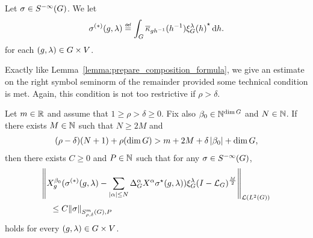 \begin{definition}
    Let $\sigma \in {S^{-\infty} (G)}$.
    We let
    \begin{align*}
        \sigma^{(*)}(g, \lambda)
        \defeq \int_\Group \conj \kappa_{g h^{-1}}(h^{-1}) \adj{\Rep \lambda(h)} \dd h.
    \end{align*}
    for each $(g, \lambda) \in G \times V$.
\end{definition}

Exactly like Lemma~\ref{lemma:prepare_composition_formula},
we give an estimate on the right symbol seminorm of the remainder provided some technical condition is met.
Again,
this condition is not too restrictive if $\rho > \delta$.

\begin{lemma}
\label{lemma:prepare_adjoint_formula}
    Let $m \in \mathbb{R}$ and
    assume that $1 \geq \rho > \delta \geq 0$.
    Fix also $\beta_0 \in \mathbb{N}^{\dim G}$ and $N \in \mathbb{N}$.
    If there exists $M \in \mathbb{N}$ such that $N \geq 2M$ and
    \begin{align*}
        (\rho - \delta) (N + 1) + \rho (\dim G)
        > m + 2 M + \delta \left|{\beta_0}\right| + \dim G,
    \end{align*}
    then there exists $C \geq 0$ and $P \in \mathbb{N}$ such that for any $\sigma \in {S^{-\infty} (G)}$,
    \begin{align*}
        &\norm [\Lin {\Lebesgue 2 \Group}] {%
        \LeftDifferentialOperator [g] {\beta_0} (
            \sigma^{(*)}(g,\lambda)
            - \sum_{\abs \alpha \leq N} \DifferenceOperatorOrder \alpha \LeftDifferentialOperator \alpha \adj \sigma(g, \lambda))
            \Rep \lambda \BesselPotential M
        }\\
        &\quad \leq C \SymbolSemiNorm m {\rho, \delta} P \sigma
    \end{align*}
    holds for every $(g, \lambda) \in G \times V$.
\end{lemma}
